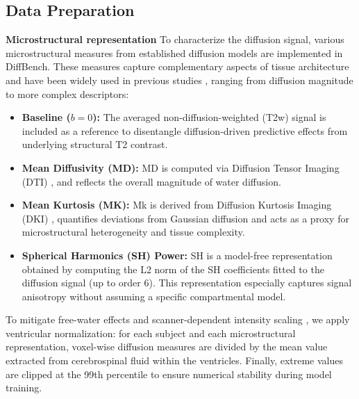 \subsection{Data Preparation}
\noindent \textbf{Microstructural representation}
To characterize the diffusion signal, various microstructural measures from established diffusion models are implemented in DiffBench.
These measures capture complementary aspects of tissue architecture and have been widely used in previous studies \cite{hwang2021prediction,he2022model,chen2023deep,cardenas2025autism}, ranging from diffusion magnitude to more complex descriptors:
\begin{itemize}
    \item \textbf{Baseline ($b=0$):} The averaged non-diffusion-weighted (T2w) signal is included as a 
    reference to disentangle diffusion-driven predictive effects from underlying structural 
    T2 contrast.   
    \item \textbf{Mean Diffusivity (MD):} MD is computed via Diffusion Tensor Imaging (DTI) \cite{basser1994mr}, and reflects 
    the overall magnitude of water diffusion.
    \item \textbf{Mean Kurtosis (MK):} Mk is derived from Diffusion Kurtosis Imaging (DKI) \cite{jensen2005diffusional}, quantifies deviations from Gaussian 
    diffusion and acts as a proxy for microstructural heterogeneity and tissue complexity.
    \item \textbf{Spherical Harmonics (SH) Power:} SH is a model-free representation obtained by computing the 
    L2 norm of the SH coefficients \cite{tournier2004direct} fitted 
    to the diffusion signal (up to order 6). This representation especially captures signal anisotropy without 
    assuming a specific compartmental model.
\end{itemize}
To mitigate free-water effects and scanner-dependent intensity scaling \cite{pasternak2009free}, we apply ventricular 
normalization: for each subject and each microstructural representation, voxel-wise diffusion measures are divided by 
the mean value extracted from cerebrospinal fluid within the ventricles. Finally, extreme values are clipped at the 
99th percentile to ensure numerical stability during model training. \\



